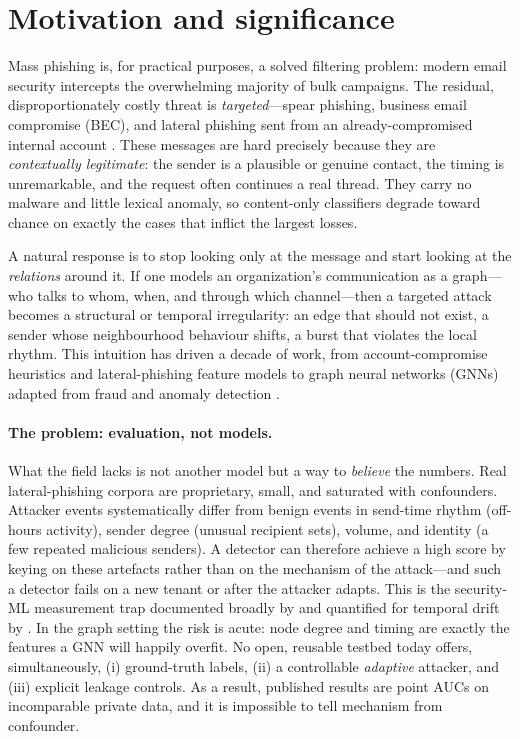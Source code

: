 \section{Motivation and significance}
\label{sec:intro}

Mass phishing is, for practical purposes, a solved filtering problem: modern email security
intercepts the overwhelming majority of bulk campaigns. The residual, disproportionately
costly threat is \emph{targeted}---spear phishing, business email compromise (BEC), and
lateral phishing sent from an already-compromised internal account
\cite{ho2019detecting,cidon2019high,apwg2024trends}. These messages are hard precisely
because they are \emph{contextually legitimate}: the sender is a plausible or genuine
contact, the timing is unremarkable, and the request often continues a real thread. They
carry no malware and little lexical anomaly, so content-only classifiers degrade toward
chance on exactly the cases that inflict the largest losses.

A natural response is to stop looking only at the message and start looking at the
\emph{relations} around it. If one models an organization's communication as a graph---who
talks to whom, when, and through which channel---then a targeted attack becomes a structural
or temporal irregularity: an edge that should not exist, a sender whose neighbourhood
behaviour shifts, a burst that violates the local rhythm. This intuition has driven a decade
of work, from account-compromise heuristics \cite{egele2013compa,stringhini2015thataint}
and lateral-phishing feature models \cite{ho2019detecting} to graph neural networks (GNNs)
\cite{kipf2017semisupervised,hamilton2017inductive} adapted from fraud and anomaly detection
\cite{dou2020enhancing,ma2021comprehensive}.

\paragraph{The problem: evaluation, not models.} What the field lacks is not another model
but a way to \emph{believe} the numbers. Real lateral-phishing corpora are proprietary,
small, and saturated with confounders. Attacker events systematically differ from benign
events in send-time rhythm (off-hours activity), sender degree (unusual recipient sets),
volume, and identity (a few repeated malicious senders). A detector can therefore achieve a
high score by keying on these artefacts rather than on the mechanism of the attack---and
such a detector fails on a new tenant or after the attacker adapts. This is the security-ML
measurement trap documented broadly by \citet{arp2022dos} and quantified for temporal drift
by \citet{pendlebury2019tesseract}. In the graph setting the risk is acute: node degree and
timing are exactly the features a GNN will happily overfit. No open, reusable testbed today
offers, simultaneously, (i) ground-truth labels, (ii) a controllable \emph{adaptive}
attacker, and (iii) explicit leakage controls. As a result, published results are point AUCs
on incomparable private data, and it is impossible to tell mechanism from confounder.


